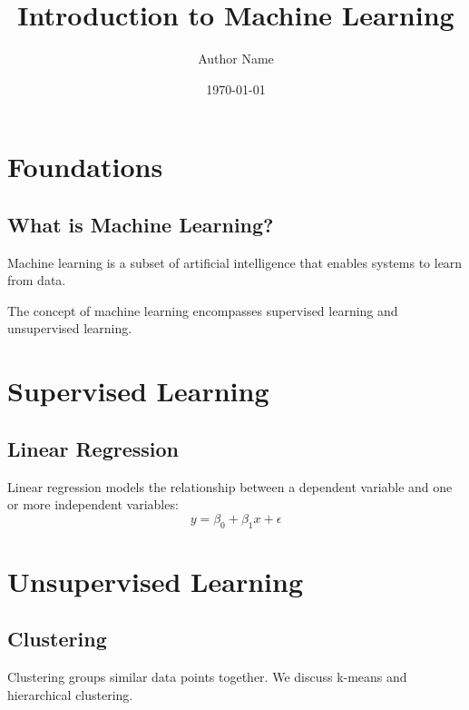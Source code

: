 \documentclass[10pt, oneside, a4paper]{book}
\begin{document}
\frontmatter
\title{Introduction to Machine Learning}
\author{Author Name}
\date{\today}
\maketitle

\tableofcontents

\mainmatter

\chapter{Foundations}
\section{What is Machine Learning?}
Machine learning is a subset of artificial intelligence
that enables systems to learn from data.

The concept of  machine learning
encompasses  supervised learning
and  unsupervised learning.

\chapter{Supervised Learning}
\section{Linear Regression}
Linear regression models the relationship between
a dependent variable and one or more independent variables:
\begin{equation}
y = \beta_0 + \beta_1 x + \epsilon
\end{equation}

\chapter{Unsupervised Learning}
\section{Clustering}
Clustering groups similar data points together.
We discuss  k-means and
 hierarchical clustering.

\backmatter



\printindex
\end{document}

